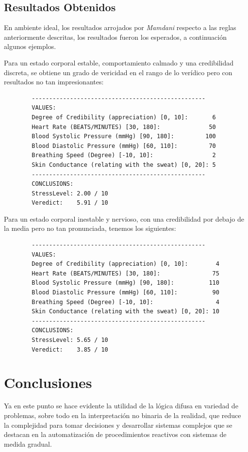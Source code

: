 \documentclass[a4paper,10pt,twocolumn]{article}
\begin{document}
  
\subsection{Resultados Obtenidos}
	En ambiente ideal, los resultados arrojados por \textit{Mamdani} respecto a las reglas anteriormente descritas, los resultados fueron los esperados, a continuaci\'on algunos ejemplos.
	
	Para un estado corporal estable, comportamiento calmado y una credibilidad discreta, se obtiene un grado de vericidad en el rango de lo ver\'idico pero con resultados no tan impresionantes:
	\begin{verbatim}
		--------------------------------------------------
		VALUES:
		Degree of Credibility (appreciation) [0, 10]:       6
		Heart Rate (BEATS/MINUTES) [30, 180]:              50
		Blood Systolic Pressure (mmHg) [90, 180]:         100
		Blood Diastolic Pressure (mmHg) [60, 110]:         70
		Breathing Speed (Degree) [-10, 10]:                 2
		Skin Conductance (relating with the sweat) [0, 20]: 5
		--------------------------------------------------
		CONCLUSIONS:
		StressLevel: 2.00 / 10
		Veredict:    5.91 / 10
	\end{verbatim}
	Para un estado corporal inestable y nervioso, con una credibilidad por debajo de la media pero no tan pronunciada, tenemos los siguientes:
	
	\begin{verbatim}
		--------------------------------------------------
		VALUES:
		Degree of Credibility (appreciation) [0, 10]:        4
		Heart Rate (BEATS/MINUTES) [30, 180]:               75
		Blood Systolic Pressure (mmHg) [90, 180]:          110
		Blood Diastolic Pressure (mmHg) [60, 110]:          90
		Breathing Speed (Degree) [-10, 10]:                  4
		Skin Conductance (relating with the sweat) [0, 20]: 10
		--------------------------------------------------
		CONCLUSIONS:
		StressLevel: 5.65 / 10
		Veredict:    3.85 / 10
	\end{verbatim}
	
 \section{Conclusiones}
 Ya en este punto se hace evidente la utilidad de la l\'ogica difusa en variedad de problemas, sobre todo en la interpretaci\'on no binaria de la realidad, que reduce la complejidad para tomar decisiones y desarrollar sistemas complejos que se destacan en la automatizaci\'on de procedimientos reactivos con sistemas de medida gradual.
\end{document}
